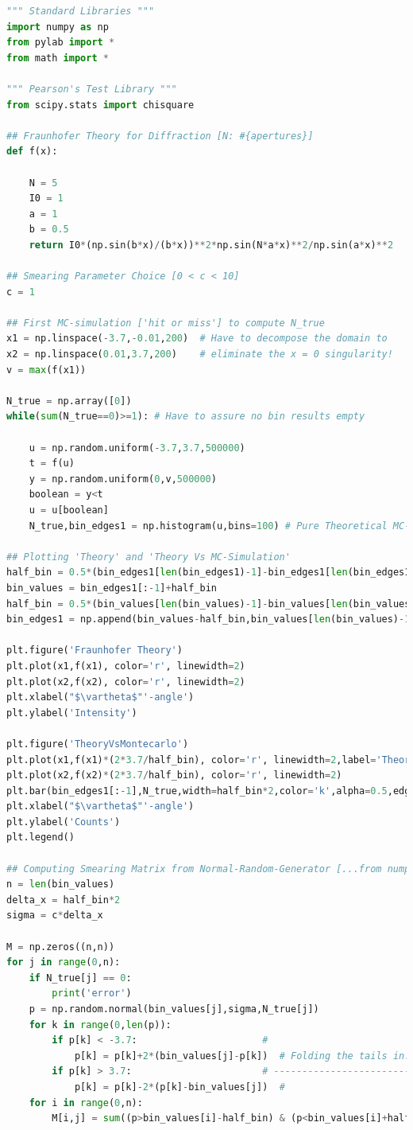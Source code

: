 \begin{lstlisting}[language=python, style=Pystyle, caption=\texttt{Python} code for Exercise 6 (Smearing and Unfolding routines), label=list:Diffraction, 	captionpos=b]
""" Standard Libraries """
import numpy as np
from pylab import *
from math import *

""" Pearson's Test Library """
from scipy.stats import chisquare 

## Fraunhofer Theory for Diffraction [N: #{apertures}]
def f(x):

	N = 5
	I0 = 1
	a = 1
	b = 0.5
	return I0*(np.sin(b*x)/(b*x))**2*np.sin(N*a*x)**2/np.sin(a*x)**2

## Smearing Parameter Choice [0 < c < 10]
c = 1

## First MC-simulation ['hit or miss'] to compute N_true
x1 = np.linspace(-3.7,-0.01,200)  # Have to decompose the domain to
x2 = np.linspace(0.01,3.7,200)    # eliminate the x = 0 singularity!
v = max(f(x1))

N_true = np.array([0])
while(sum(N_true==0)>=1): # Have to assure no bin results empty

	u = np.random.uniform(-3.7,3.7,500000)
	t = f(u)
	y = np.random.uniform(0,v,500000)
	boolean = y<t
	u = u[boolean]
	N_true,bin_edges1 = np.histogram(u,bins=100) # Pure Theoretical MC-Simulation

## Plotting 'Theory' and 'Theory Vs MC-Simulation'
half_bin = 0.5*(bin_edges1[len(bin_edges1)-1]-bin_edges1[len(bin_edges1)-2])
bin_values = bin_edges1[:-1]+half_bin
half_bin = 0.5*(bin_values[len(bin_values)-1]-bin_values[len(bin_values)-2])
bin_edges1 = np.append(bin_values-half_bin,bin_values[len(bin_values)-1]+half_bin)

plt.figure('Fraunhofer Theory')
plt.plot(x1,f(x1), color='r', linewidth=2)
plt.plot(x2,f(x2), color='r', linewidth=2)
plt.xlabel("$\vartheta$"'-angle')
plt.ylabel('Intensity')

plt.figure('TheoryVsMontecarlo')
plt.plot(x1,f(x1)*(2*3.7/half_bin), color='r', linewidth=2,label='Theory')
plt.plot(x2,f(x2)*(2*3.7/half_bin), color='r', linewidth=2)
plt.bar(bin_edges1[:-1],N_true,width=half_bin*2,color='k',alpha=0.5,edgecolor='k',label='Pure MC')
plt.xlabel("$\vartheta$"'-angle')
plt.ylabel('Counts')
plt.legend()

## Computing Smearing Matrix from Normal-Random-Generator [...from numpy library]
n = len(bin_values)
delta_x = half_bin*2
sigma = c*delta_x

M = np.zeros((n,n))
for j in range(0,n):
	if N_true[j] == 0:
		print('error')
	p = np.random.normal(bin_values[j],sigma,N_true[j])
	for k in range(0,len(p)):
		if p[k] < -3.7:                      #
			p[k] = p[k]+2*(bin_values[j]-p[k])  # Folding the tails in...
		if p[k] > 3.7:                       # ------------------------
			p[k] = p[k]-2*(p[k]-bin_values[j])  # 
	for i in range(0,n):
		M[i,j] = sum((p>bin_values[i]-half_bin) & (p<bin_values[i]+half_bin))/(N_true[j]*1.0)


\end{lstlisting}
